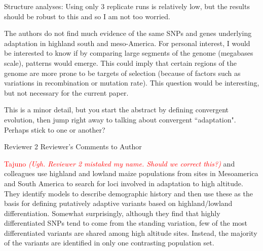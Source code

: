 \documentclass[onecolumn,oneside,letterpaper]{article}
\newcommand{\st}[1]{\textcolor{red}{ #1}}
\newcommand{\comst}[1]{\textcolor{red}{ \em{\scriptsize  (#1)}} }
\begin{document}
Structure analyses:  Using only 3 replicate runs is relatively low, but the results should be robust to this and so I am not too worried.  

The authors do not find much evidence of the same SNPs and genes underlying adaptation in highland south and meso-America. For personal interest, I would be interested to know if by comparing large segments of the genome (megabases scale), patterns would emerge.  This could imply that certain regions of the genome are more prone to be targets of selection  (because of factors such as variations in recombination or mutation rate). This question would be interesting, but not necessary for the current paper.    


This is a minor detail, but you start the abstract by defining convergent evolution, then jump right away to talking about convergent ``adaptation".  Perhaps stick to one or another? 
\response{
We agreed and fixed the abstract.  Thanks!!  \st{I modified Abstract, Jeff.  Please check!!} 
}

Reviewer 2 Reviewer's Comments to Author

\st{Tajuno} \comst{Ugh.  Reviewer 2 mistaked my name.  Should we correct this?} and colleagues use highland and lowland maize populations from sites in Mesoamerica and South America to search for loci involved in adaptation to high altitude.  They identify models to describe demographic history and then use these as the basis for defining putatively adaptive variants based on highland/lowland differentiation.  Somewhat surprisingly, although they find that highly differentiated SNPs tend to come from the standing variation, few of the most differentiated variants are shared among high altitude sites. Instead, the majority of the variants are identified in only one contrasting population set.   
\end{document}
